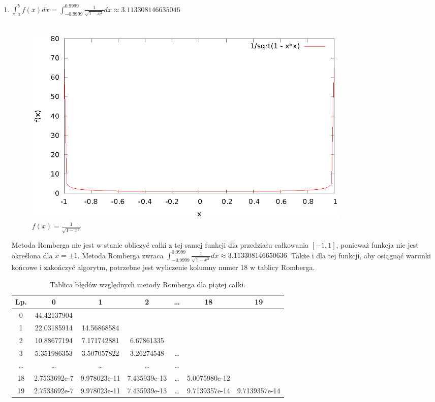 \documentclass{article}
\begin{document}
\begin{enumerate}
	\item $\int_a^b f(x) dx = \int_{-0.9999}^{0.9999} \frac{1}{\sqrt{1 - x^2}} dx \approx 3.113308146635046$ \\ \\
	\begin{figure}[H]
		\centering
		\includegraphics[width=0.8\textwidth]{wykresy/5.eps}
		\caption{$f(x) = \frac{1}{\sqrt{1 - x^2}}$}
	\end{figure}
	Metoda Romberga nie jest w stanie obliczyć całki z tej samej funkcji dla przedziału całkowania $[-1,1]$,
	ponieważ funkcja nie jest określona dla $x = \pm 1$.
	\newline
	Metoda Romberga zwraca $\int_{-0.9999}^{0.9999} \frac{1}{\sqrt{1 - x^2}} dx \approx 3.113308146650636$.
	Także i dla tej funkcji, aby osiągnąć warunki końcowe i zakończyć algorytm, potrzebne jest wyliczenie kolumny
	numer 18 w tablicy Romberga.

	\begin{table}[h]
	\centering
	\begin{tabular}[c]{|c|c|c|c|c|c|c|}
	\hline
	Lp. & 0 & 1 & 2 & \ldots & 18 & 19 \\
	\hline
	0 & 44.42137904 &  &  &  &  & \\
	1 & 22.03185914 & 14.56868584 &  &  & & \\
	2 & 10.88677194 & 7.171742881 & 6.67861335 & & & \\
	3 & 5.351986353 & 3.507057822 & 3.26274548	& \dots &  &  \\
	\dots & \dots & \dots & \dots & \dots & & \\
	18 & 2.7533692e-7 & 9.978023e-11 & 7.435939e-13 & \dots & 5.0075980e-12 &  \\
	19 & 2.7533692e-7 & 9.978023e-11 & 7.435939e-13 & \dots & 9.7139357e-14	& 9.7139357e-14	 \\
	\hline
	\end{tabular}
	\caption{Tablica błędów względnych metody Romberga dla piątej całki.}
	\end{table}

\end{enumerate}
\end{document}
